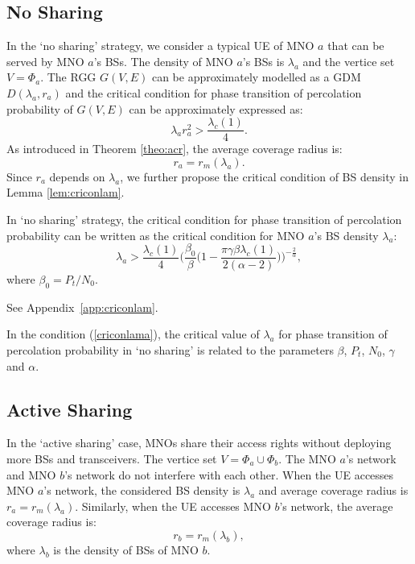 \documentclass[final]{IEEEtran}
\begin{document}
\subsection{No Sharing}
\indent In the `no sharing' strategy, we consider a typical UE of MNO $a$ that can be served by MNO $a$'s BSs. The density of MNO $a$'s BSs is $\lambda_a$ and the vertice set $V=\Phi_a$. The RGG $G(V,E)$ can be approximately modelled as a GDM $D(\lambda_a,r_{a})$ and the critical condition for phase transition of percolation probability of $G(V,E)$ can be approximately expressed as:
\begin{equation}\label{ama2}
    \lambda_a r_{a}^2>\frac{\lambda_c(1)}{4}.
\end{equation}
\indent As introduced in Theorem \ref{theo:acr}, the average coverage radius is:%
\begin{equation}
    r_a=r_m(\lambda_a).
\end{equation} Since $r_{a}$ depends on $\lambda_a$, we further propose the critical condition of BS density in Lemma \ref{lem:criconlam}.
\begin{lemma}\label{lem:criconlam}
    In `no sharing' strategy, the critical condition for phase transition of percolation probability can be written as the critical condition for MNO $a$'s BS density $\lambda_a$:
\begin{equation}\label{criconlama}
    \lambda_a>\frac{\lambda_c(1)}{4}\bigg(\frac{\beta_0}{\beta}\bigg(1-\frac{\pi \gamma \beta\lambda_c(1)}{2(\alpha-2)}\bigg)\bigg)^{-\frac{2}{\alpha}},
\end{equation}
where $\beta_0=P_t/N_0.$
\end{lemma}
\begin{IEEEproof}
    See Appendix~\ref{app:criconlam}.
\end{IEEEproof}
\indent In the condition (\ref{criconlama}), the critical value of $\lambda_a$ for phase transition of percolation probability in `no sharing' is related to the parameters  $\beta$, $P_t$, $N_0$, $\gamma$ and $\alpha$.

\subsection{Active Sharing}
In the `active sharing' case, MNOs share their access rights without deploying more BSs and transceivers. The vertice set $V=\Phi_a \cup \Phi_b$. The MNO $a$'s network and MNO $b$'s network do not interfere with each other. When the UE accesses MNO $a$'s network, the considered BS density is $\lambda_a$ and average coverage radius is $r_a=r_m(\lambda_a)$. Similarly, when the UE accesses MNO $b$'s network, the average coverage radius is: 
\begin{equation}
    r_{b}=r_m(\lambda_b),
\end{equation}
where $\lambda_b$ is the density of BSs of MNO $b$.
\end{document}
